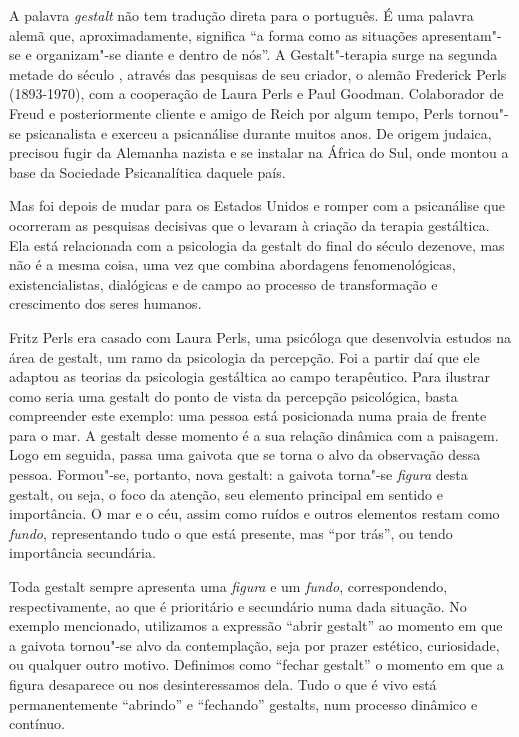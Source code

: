 A palavra \emph{gestalt} não tem tradução direta para o português. É uma
palavra alemã que, aproximadamente, significa ``a forma como as
situações apresentam"-se e organizam"-se diante e dentro de nós''. A
Gestalt"-terapia surge na segunda metade do século , através das
pesquisas de seu criador, o alemão Frederick Perls (1893-1970), com a
cooperação de Laura Perls e Paul Goodman. Colaborador de Freud e posteriormente cliente e amigo de Reich
por algum tempo, Perls tornou"-se psicanalista e exerceu a psicanálise
durante muitos anos. De origem judaica, precisou fugir da Alemanha
nazista e se instalar na África do Sul, onde montou a base da Sociedade
Psicanalítica daquele país.

Mas foi depois de mudar para os Estados Unidos e romper com a
psicanálise que ocorreram as pesquisas decisivas que o levaram à criação
da terapia gestáltica. Ela está relacionada com a psicologia da gestalt do final do século dezenove, mas não é a mesma coisa, uma vez que combina abordagens fenomenológicas, existencialistas, dialógicas e de campo ao processo de transformação e crescimento dos seres humanos.

Fritz Perls era casado com Laura Perls, uma psicóloga que desenvolvia estudos na área de gestalt, um
ramo da psicologia da percepção. Foi a partir daí que ele adaptou as
teorias da psicologia gestáltica ao campo terapêutico. Para ilustrar
como seria uma gestalt do ponto de vista da percepção psicológica, basta
compreender este exemplo: uma pessoa está posicionada numa praia de
frente para o mar. A gestalt desse momento é a sua relação dinâmica com
a paisagem. Logo em seguida, passa uma gaivota que se torna o alvo da
observação dessa pessoa. Formou"-se, portanto, nova gestalt: a gaivota
torna"-se \emph{figura} desta gestalt, ou seja, o foco da atenção, seu
elemento principal em sentido e importância. O mar e o céu, assim como
ruídos e outros elementos restam como \emph{fundo}, representando tudo o
que está presente, mas ``por trás'', ou tendo importância secundária.

Toda gestalt sempre apresenta uma \emph{figura} e um \emph{fundo},
correspondendo, respectivamente, ao que é prioritário e secundário numa
dada situação. No exemplo mencionado, utilizamos a expressão ``abrir
gestalt'' ao momento em que a gaivota tornou"-se alvo da contemplação,
seja por prazer estético, curiosidade, ou qualquer outro motivo.
Definimos como ``fechar gestalt'' o momento em que a figura desaparece
ou nos desinteressamos dela. Tudo o que é vivo está permanentemente
``abrindo'' e ``fechando'' gestalts, num processo dinâmico e contínuo.

